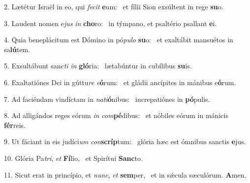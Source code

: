 2. Lætétur Israël in eo, qui \textit{fe}\textit{cit} \textbf{e}um: \ast\  et fílii Sion exsúltent in rege \textbf{su}o.\

3. Laudent nomen e\textit{jus} \textit{in} \textbf{cho}ro: \ast\  in týmpano, et psaltério psallant \textbf{e}i.\

4. Quia beneplácitum est Dómino in pó\textit{pu}\textit{lo} \textbf{su}o: \ast\  et exaltábit mansuétos in sa\textbf{lú}tem.\

5. Exsultábunt sanc\textit{ti} \textit{in} \textbf{gló}ria: \ast\  lætabúntur in cubílibus \textbf{su}is.\

6. Exaltatiónes Dei in gúttu\textit{re} \textit{e}\textbf{ó}rum: \ast\  et gládii ancípites in mánibus e\textbf{ó}rum.\

7. Ad faciéndam vindíctam in \textit{na}\textit{ti}\textbf{ó}nibus: \ast\  increpatiónes in \textbf{pó}pulis.\

8. Ad alligándos reges eórum \textit{in} \textit{com}\textbf{pé}dibus: \ast\  et nóbiles eórum in mánicis \textbf{fér}reis.\

9. Ut fáciant in eis judíci\textit{um} \textit{con}\textbf{scríp}tum: \ast\  glória hæc est ómnibus sanctis \textbf{e}jus.\

10. Glória Pa\textit{tri}, \textit{et} \textbf{Fí}lio, \ast\  et Spirítui \textbf{Sanc}to.\

11. Sicut erat in princípio, et \textit{nunc}, \textit{et} \textbf{sem}per, \ast\  et in sǽcula sæculórum. \textbf{A}men.\

